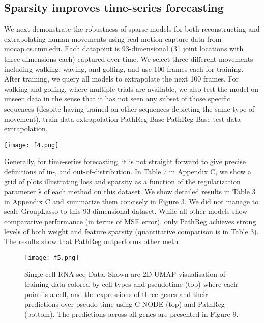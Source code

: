 \documentclass{article}
\begin{document}
    \subsection{Sparsity improves time-series forecasting}
    \begin{minipage}{0.5\textwidth}
    We next demonstrate the robustness of sparse models for both reconstructing and extrapolating human movements using real motion capture data from mocap.cs.cmu.edu. Each
    datapoint is 93-dimensional (31 joint locations with three dimensions each) captured over
    time. We select three different movements including walking, waving, and golfing, and use
    100 frames each for training. After training, we query all models to extrapolate the next
    100 frames. For walking and golfing, where multiple trials are available, we also test the
    model on unseen data in the sense that it has not seen any subset of those specific sequences (despite having trained on other sequences depicting the same type of movement).
    train	data
    extrapolation
    PathReg
    Base
    PathReg
    Base
    test	data  extrapolation.
    \end{minipage}
    \hfill
    \begin{minipage}{0.45\textwidth}
    \centering
    \texttt{[image: f4.png]} %
    \label{fig:sparsity}
    \end{minipage}
    \vspace{20pt}
    
   
    Generally, for time-series forecasting, it is not
    straight forward to give precise definitions of
    in-, and out-of-distribution. In Table 7 in Appendix C, we show a grid of plots illustrating
    loss and sparsity as a function of the regularization parameter λ of each method on this
    dataset. We show detailed results in Table 3
    in Appendix C and summarize them concisely
    in Figure 3. We did not manage to scale GroupLasso to this 93-dimensional dataset. While
    all other models show comparative performance
    (in terms of MSE error), only PathReg achieves
    strong levels of both weight and feature sparsity
    (quantitative comparison is in Table 3). The results show that PathReg outperforms other meth
    \setcounter{figure}{4}
    \begin{figure}[h]
    \centering
    \texttt{[image: f5.png]}
    \caption{Single-cell RNA-seq Data. Shown are 2D UMAP visualisation of training data colored
    by cell types and pseudotime (top) where each point is a cell, and the expressions of three genes
    and their predictions over pseudo time using C-NODE (top) and PathReg (bottom). The predictions
    across all genes are presented in Figure 9.
    }
    \label{fig:f5}
    \end{figure}
    
\end{document}
